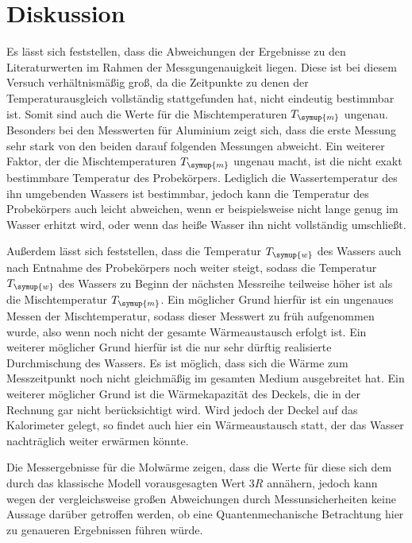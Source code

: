 \section{Diskussion}
\label{sec:Diskussion}

Es lässt sich feststellen, dass die Abweichungen der Ergebnisse zu den Literaturwerten
im Rahmen der Messgungenauigkeit liegen. Diese ist bei diesem Versuch verhältnismäßig groß,
da die Zeitpunkte zu denen der Temperaturausgleich vollständig stattgefunden hat, nicht
eindeutig bestimmbar ist. Somit sind auch die Werte für die Mischtemperaturen $T_{\symup{m}}$
ungenau. Besonders bei den Messwerten für Aluminium zeigt sich, dass die erste Messung
sehr stark von den beiden darauf folgenden Messungen abweicht.
Ein weiterer Faktor, der die Mischtemperaturen $T_{\symup{m}}$ ungenau macht, ist die
nicht exakt bestimmbare Temperatur des Probekörpers. Lediglich die Wassertemperatur des
ihn umgebenden Wassers ist bestimmbar, jedoch kann die Temperatur des Probekörpers auch
leicht abweichen, wenn er beispielsweise nicht lange genug im Wasser erhitzt wird,
oder wenn das heiße Wasser ihn nicht vollständig umschließt.

Außerdem lässt sich feststellen, dass die Temperatur $T_{\symup{w}}$ des Wassers auch
nach Entnahme des Probekörpers noch weiter steigt, sodass die Temperatur
$T_{\symup{w}}$ des Wassers zu Beginn der nächsten Messreihe teilweise höher ist
als die Mischtemperatur $T_{\symup{m}}$. Ein möglicher Grund hierfür ist ein ungenaues
Messen der Mischtemperatur, sodass dieser Messwert zu früh aufgenommen wurde, also wenn
noch nicht der gesamte Wärmeaustausch erfolgt ist. Ein weiterer möglicher Grund hierfür
ist die nur sehr dürftig realisierte Durchmischung des Wassers. Es ist möglich, dass
sich die Wärme zum Messzeitpunkt noch nicht gleichmäßig im gesamten Medium ausgebreitet hat.
Ein weiterer möglicher Grund ist die Wärmekapazität des Deckels, die in der Rechnung
gar nicht berücksichtigt wird. Wird jedoch der Deckel auf das Kalorimeter gelegt, so findet
auch hier ein Wärmeaustausch statt, der das Wasser nachträglich weiter erwärmen könnte.

Die Messergebnisse für die Molwärme zeigen, dass die Werte für diese sich dem durch
das klassische Modell vorausgesagten Wert $3R$ annähern, jedoch kann wegen der vergleichsweise
großen Abweichungen durch Messunsicherheiten keine Aussage darüber getroffen werden, ob
eine Quantenmechanische Betrachtung hier zu genaueren Ergebnissen führen würde.
